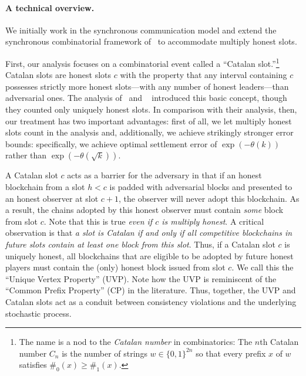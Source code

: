 \paragraph{A technical overview.}
We initially work in the synchronous communication model and extend
the synchronous combinatorial framework
of~\cite{LinearConsistency} to accommodate multiply honest
slots. 

First, our analysis focuses on a combinatorial event called a ``Catalan
slot.''\footnote{The name is a nod to the \emph{Catalan number} in
  combinatorics: The $n$th Catalan number $C_n$ is the number of
  strings $w \in \{0, 1\}^{2n}$ so that every prefix $x$ of $w$
  satisfies $\#_0(x) \geq \#_1(x)$.} Catalan slots are honest slots
$c$ with the property that any interval containing $c$ possesses
strictly more honest slots---with any number of honest leaders---than
adversarial ones. The analysis of~\cite{SnowWhite} and ~\cite{Sleepy}
introduced this basic concept, though they counted only uniquely
honest slots. In comparison with their analysis, then, our treatment
has two important advantages: first of all, we let multiply honest
slots count in the analysis and, additionally, we achieve strikingly
stronger error bounds: specifically, we achieve optimal settlement
error of $\exp(-\theta(k))$ rather than $\exp(-\theta(\sqrt{k}))$.

A Catalan slot $c$ acts as a barrier for the adversary in that if an
honest blockchain from a slot $h < c$ is padded with adversarial
blocks and presented to an honest observer at slot $c + 1$, the
observer will never adopt this blockchain.  As a result, the chains
adopted by this honest observer must contain \emph{some} block from
slot $c$.  Note that this is true \emph{even if $c$ is
  multiply honest}.  A critical observation is that \emph{a slot is
  Catalan if and only if all competitive blockchains in future slots
  contain at least one block from this slot}.  Thus, if a Catalan slot
$c$ is uniquely honest, all blockchains that are eligible to be
adopted by future honest players must contain the (only) honest block
issued from slot $c$.  We call this the ``Unique Vertex Property''
(UVP).  Note how the UVP is reminiscent of the ``Common Prefix
Property'' (CP) in the literature. Thus, together, the UVP and 
Catalan slots act as a conduit between consistency
violations and the underlying stochastic process. 

